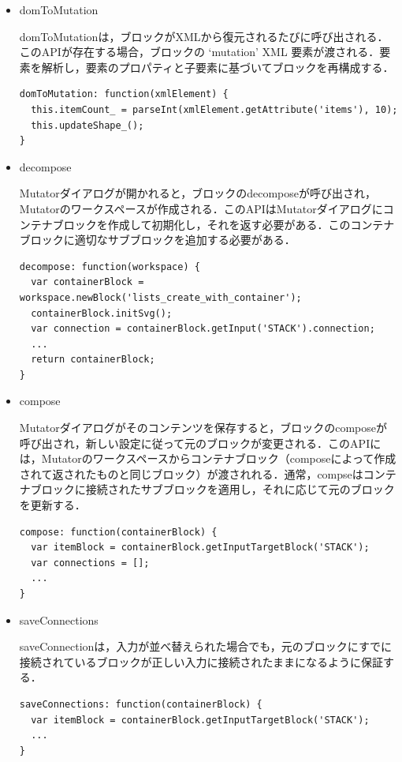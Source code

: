 \documentclass{risepaper}
\begin{document}
\begin{itemize}
\item domToMutation

domToMutationは，ブロックがXMLから復元されるたびに呼び出される．このAPIが存在する場合，ブロックの `mutation' XML 要素が渡される．要素を解析し，要素のプロパティと子要素に基づいてブロックを再構成する．

\begin{lstlisting}[basicstyle=\ttfamily\footnotesize]
domToMutation: function(xmlElement) {
  this.itemCount_ = parseInt(xmlElement.getAttribute('items'), 10);
  this.updateShape_();
}
\end{lstlisting}

\item decompose

Mutatorダイアログが開かれると，ブロックのdecomposeが呼び出され，Mutatorのワークスペースが作成される．このAPIはMutatorダイアログにコンテナブロックを作成して初期化し，それを返す必要がある．このコンテナブロックに適切なサブブロックを追加する必要がある．

\begin{lstlisting}[basicstyle=\ttfamily\footnotesize]
decompose: function(workspace) {
  var containerBlock = workspace.newBlock('lists_create_with_container');
  containerBlock.initSvg();
  var connection = containerBlock.getInput('STACK').connection;
  ...
  return containerBlock;
}
\end{lstlisting}

\item compose

Mutatorダイアログがそのコンテンツを保存すると，ブロックのcomposeが呼び出され，新しい設定に従って元のブロックが変更される．このAPIには，Mutatorのワークスペースからコンテナブロック（composeによって作成されて返されたものと同じブロック）が渡されれる．通常，compseはコンテナブロックに接続されたサブブロックを適用し，それに応じて元のブロックを更新する．

\begin{lstlisting}[basicstyle=\ttfamily\footnotesize]
compose: function(containerBlock) {
  var itemBlock = containerBlock.getInputTargetBlock('STACK');
  var connections = [];
  ...
}
\end{lstlisting}

\item saveConnections

saveConnectionは，入力が並べ替えられた場合でも，元のブロックにすでに接続されているブロックが正しい入力に接続されたままになるように保証する．

\begin{lstlisting}[basicstyle=\ttfamily\footnotesize]
saveConnections: function(containerBlock) {
  var itemBlock = containerBlock.getInputTargetBlock('STACK');
  ...
}
\end{lstlisting}

\end{itemize} 
\end{document}
